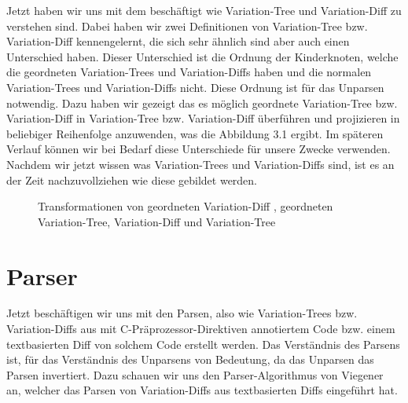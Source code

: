 Jetzt haben wir uns mit dem beschäftigt wie Variation-Tree und Variation-Diff zu verstehen sind. Dabei haben wir zwei Definitionen von Variation-Tree bzw. Variation-Diff kennengelernt, die sich sehr ähnlich sind aber auch einen Unterschied haben. Dieser Unterschied ist die Ordnung der Kinderknoten, welche die geordneten Variation-Trees und Variation-Diffs haben und die normalen Variation-Trees und Variation-Diffs nicht. Diese Ordnung ist für das Unparsen notwendig. Dazu haben wir gezeigt das es möglich geordnete Variation-Tree bzw. Variation-Diff in Variation-Tree bzw. Variation-Diff überführen und projizieren in beliebiger Reihenfolge anzuwenden, was die Abbildung 3.1 ergibt. Im späteren Verlauf können wir bei Bedarf diese Unterschiede für unsere Zwecke verwenden. Nachdem wir jetzt wissen was Variation-Trees und Variation-Diffs sind, ist es an der Zeit nachzuvollziehen wie diese gebildet werden.

\begin{figure}[H]
	\centering
	\caption{Transformationen von geordneten Variation-Diff , geordneten Variation-Tree, Variation-Diff und Variation-Tree}
\end{figure}


\section{Parser}

Jetzt beschäftigen wir uns mit den Parsen, also wie Variation-Trees bzw. Variation-Diffs  aus mit C-Präprozessor-Direktiven annotiertem Code bzw. einem textbasierten Diff von solchem Code erstellt werden. Das Verständnis des Parsens ist, für das Verständnis des Unparsens von Bedeutung, da das Unparsen das Parsen invertiert. Dazu schauen wir uns den Parser-Algorithmus von Viegener~\cite{Viegener21} an, welcher das Parsen von Variation-Diffs aus textbasierten Diffs eingeführt hat.\\


